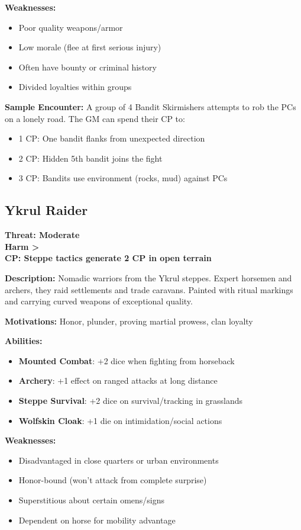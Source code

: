 \documentclass[12pt]{article}
\newcommand{\cp}[1]{\textbf{CP: #1}}
\newcommand{\harm}[1]{\textbf{Harm #1}}
\newcommand{\threat}[1]{\textbf{Threat: #1}}
\begin{document}
\textbf{Weaknesses:}
\begin{itemize}
\item Poor quality weapons/armor
\item Low morale (flee at first serious injury)
\item Often have bounty or criminal history
\item Divided loyalties within groups
\end{itemize}

\textbf{Sample Encounter:}
A group of 4 Bandit Skirmishers attempts to rob the PCs on a lonely road. The GM can spend their CP to:
\begin{itemize}
\item 1 CP: One bandit flanks from unexpected direction
\item 2 CP: Hidden 5th bandit joins the fight
\item 3 CP: Bandits use environment (rocks, mud) against PCs
\end{itemize}

\subsection*{Ykrul Raider}

\threat{Moderate} \\
\harm{>} \\
\cp{Steppe tactics generate 2 CP in open terrain}

\vspace{0.5em}
\textbf{Description:} Nomadic warriors from the Ykrul steppes. Expert horsemen and archers, they raid settlements and trade caravans. Painted with ritual markings and carrying curved weapons of exceptional quality.

\textbf{Motivations:} Honor, plunder, proving martial prowess, clan loyalty

\textbf{Abilities:}
\begin{itemize}
\item \textbf{Mounted Combat}: +2 dice when fighting from horseback
\item \textbf{Archery}: +1 effect on ranged attacks at long distance
\item \textbf{Steppe Survival}: +2 dice on survival/tracking in grasslands
\item \textbf{Wolfskin Cloak}: +1 die on intimidation/social actions
\end{itemize}

\textbf{Weaknesses:}
\begin{itemize}
\item Disadvantaged in close quarters or urban environments
\item Honor-bound (won't attack from complete surprise)
\item Superstitious about certain omens/signs
\item Dependent on horse for mobility advantage
\end{itemize}
\end{document}

